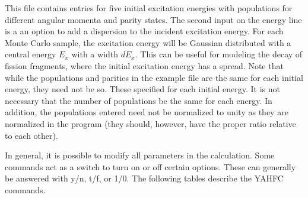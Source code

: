 \documentclass[
10pt,
showpacs,preprintnumbers,nofootinbib,
amsmath,amssymb,
aps,prc,groupedaddress,superscriptaddress,
notitlepage,showkeys
]{revtex4-1}
\begin{document}
This file contains entries for five initial excitation energies with populations for different angular momenta and parity states. The second input on the energy line is a an option to add a dispersion to the incident excitation energy. For each Monte Carlo sample, the excitation energy will be Gaussian distributed with a central energy $E_x$ with a width $dE_x$. This can be useful for modeling the decay of fission fragments, where the initial excitation energy has a spread. Note that while the populations and parities in the example file are the same for each initial energy, they need not be so. These specified for each initial energy. It is not necessary that the number of populations be the same for each energy. In addition, the populations entered need not be normalized to unity as they are normalized in the program (they should, however, have the proper ratio relative to each other).

In general, it is possible to modify all parameters in the calculation. Some commands act as a switch to turn on or off certain options. These can generally be answered with y/n, t/f, or 1/0. The following tables describe the YAHFC commands.
\end{document}
